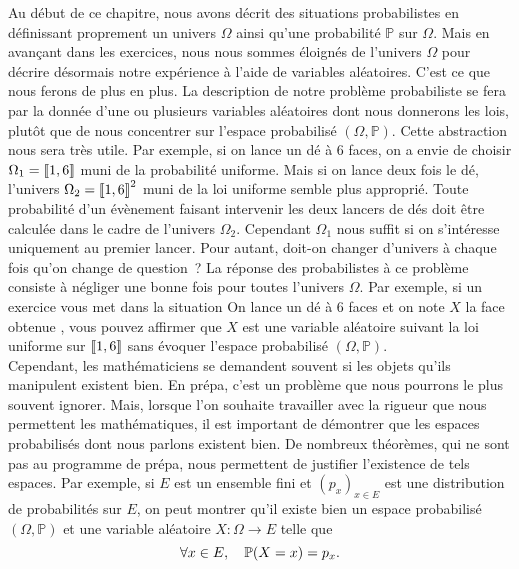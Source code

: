 \documentclass{magnolia}
\begin{document}

\begin{center}


\end{center}


Au début de ce chapitre, nous avons décrit des situations probabilistes en définissant
proprement un univers $\Omega$ ainsi qu'une probabilité $\mathbb{P}$ sur $\Omega$.
Mais en avançant dans les exercices, nous nous sommes éloignés
de l'univers $\Omega$ pour décrire désormais notre expérience à l'aide de variables aléatoires.
C'est ce que nous ferons de plus en plus. La description de notre problème probabiliste
se fera par la donnée d'une ou plusieurs variables aléatoires dont nous donnerons les
lois, plutôt que de nous concentrer sur l'espace probabilisé $(\Omega,\mathbb{P})$. Cette
abstraction nous sera très utile. Par exemple, si on lance un dé à 6 faces, on a envie
de choisir $\Omega_1=\left\llbracket 1,6\right\rrbracket$ muni de la probabilité uniforme. Mais si on lance
deux fois le dé, l'univers $\Omega_2=\left\llbracket 1,6\right\rrbracket^2$ muni de la loi uniforme semble
plus approprié. Toute probabilité d'un évènement faisant intervenir les deux lancers de
dés doit être calculée dans le cadre de l'univers $\Omega_2$. Cependant $\Omega_1$ nous suffit
si on s'intéresse uniquement au premier lancer. Pour autant, doit-on changer d'univers à chaque fois
qu'on change de question~? La réponse des probabilistes à ce problème consiste à négliger
une bonne fois pour toutes l'univers $\Omega$. Par exemple, si un exercice vous met dans la
situation \og On lance un dé à 6 faces et on note $X$ la face obtenue \fg, vous pouvez
affirmer que $X$ est une variable aléatoire suivant la loi uniforme sur $\left\llbracket 1,6\right\rrbracket$
sans évoquer l'espace probabilisé $(\Omega,\mathbb{P})$.\\

Cependant, les mathématiciens se demandent souvent si les objets qu'ils manipulent existent bien.
En prépa, c'est un problème que nous pourrons le plus souvent ignorer. Mais, lorsque l'on souhaite
travailler avec la rigueur que nous permettent les mathématiques, il est important de démontrer que
les espaces probabilisés dont nous parlons existent bien. De nombreux théorèmes, qui ne sont pas
au programme de prépa, nous permettent de
justifier l'existence de tels espaces. Par exemple, si $E$ est un ensemble fini et $(p_x)_{x\in E}$ est
une distribution de probabilités sur $E$, on peut montrer qu'il existe bien un espace probabilisé
$(\Omega,\mathbb{P})$ et une variable aléatoire $X:\Omega\to E$ telle que
\[\forall x\in E,\quad \mathbb{P}(X=x)=p_x.\]
\end{document}
